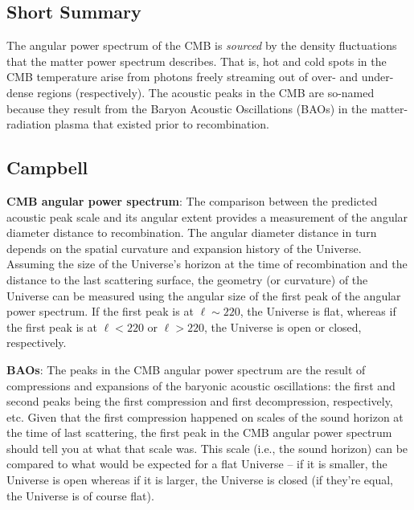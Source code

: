 \documentclass[\main/main.tex]{subfiles}
\begin{document}
    \subsection{Short Summary}
        The angular power spectrum of the CMB is \textit{sourced} by the density fluctuations that the matter power spectrum describes. That is, hot and cold spots in the CMB temperature arise from photons freely streaming out of over- and under-dense regions (respectively). The acoustic peaks in the CMB are so-named because they result from the Baryon Acoustic Oscillations (BAOs) in the matter-radiation plasma that existed prior to recombination.  

\subsection{Campbell} %
\label{sub:campbell}

{\noindent}\textbf{CMB angular power spectrum}: The comparison between the predicted acoustic peak scale and its angular extent provides a measurement of the angular diameter distance to recombination. The angular diameter distance in turn depends on the spatial curvature and expansion history of the Universe. Assuming the size of the Universe's horizon at the time of recombination and the distance to the last scattering surface, the geometry (or curvature) of the Universe can be measured using the angular size of the first peak of the angular power spectrum. If the first peak is at $\ell\sim220$, the Universe is flat, whereas if the first peak is at $\ell<220$ or $\ell>220$, the Universe is open or closed, respectively.

{\noindent}\textbf{BAOs}: The peaks in the CMB angular power spectrum are the result of compressions and expansions of the baryonic acoustic oscillations: the first and second peaks being the first compression and first decompression, respectively, etc. Given that the first compression happened on scales of the sound horizon at the time of last scattering, the first peak in the CMB angular power spectrum should tell you at what that scale was. This scale (i.e., the sound horizon) can be compared to what would be expected for a flat Universe -- if it is smaller, the Universe is open whereas if it is larger, the Universe is closed (if they're equal, the Universe is of course flat).



\end{document}
